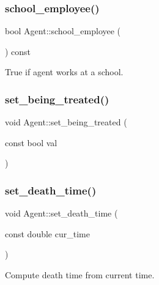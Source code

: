 \subsubsection{\texorpdfstring{school\+\_\+employee()}{school\_employee()}}
{\footnotesize\ttfamily bool Agent\+::school\+\_\+employee (\begin{DoxyParamCaption}{ }\end{DoxyParamCaption}) const\hspace{0.3cm}{\ttfamily [inline]}}



True if agent works at a school. 

\mbox{\label{classAgent_a93847d02492d357ceb787aee6cfd0494}} 
\subsubsection{\texorpdfstring{set\+\_\+being\+\_\+treated()}{set\_being\_treated()}}
{\footnotesize\ttfamily void Agent\+::set\+\_\+being\+\_\+treated (\begin{DoxyParamCaption}\item[{const bool}]{val }\end{DoxyParamCaption})\hspace{0.3cm}{\ttfamily [inline]}}

\mbox{\label{classAgent_a1df245aa715f81813b853931db39a398}} 
\subsubsection{\texorpdfstring{set\+\_\+death\+\_\+time()}{set\_death\_time()}}
{\footnotesize\ttfamily void Agent\+::set\+\_\+death\+\_\+time (\begin{DoxyParamCaption}\item[{const double}]{cur\+\_\+time }\end{DoxyParamCaption})\hspace{0.3cm}{\ttfamily [inline]}}



Compute death time from current time. 

\mbox{\label{classAgent_a0aebc28223173d54cf285de7705e6ff9}} 
